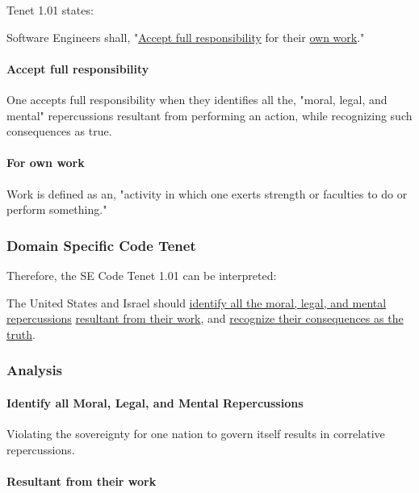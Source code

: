 \documentclass[12pt]{article}
\begin{document}
\begin{multicols}{2}
Tenet 1.01 states:
\begin{framed}
Software Engineers shall, "\underline{Accept full responsibility} for their \underline{own work}."\cite{softwareEngineeringCodeOfEthics}
\end{framed}

\paragraph{Accept full responsibility}
One accepts full responsibility when they identifies all the, "moral, legal, and mental" repercussions resultant from performing an action, while recognizing such consequences as true.\cite{cambridgeDictionary}\cite{cambridgeDictionary}

\paragraph{For own work}
Work is defined as an, "activity in which one exerts strength or faculties to do or perform something."\cite{cambridgeDictionary}

\subsubsection{Domain Specific Code Tenet}

Therefore, the SE Code Tenet 1.01 can be interpreted:
\begin{framed}
The United States and Israel should \ul{identify all the moral, legal, and mental repercussions} \ul{resultant from their work}, and \ul{recognize their consequences as the truth}.
\end{framed}

\subsubsection{Analysis}

\paragraph{Identify all Moral, Legal, and Mental Repercussions}

Violating the sovereignty for one nation to govern itself results in correlative repercussions.

\paragraph{Resultant from their work}


\end{multicols}
\end{document}
